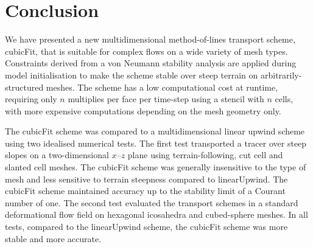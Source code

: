\section{Conclusion}

We have presented a new multidimensional method-of-lines transport scheme, cubicFit, that is suitable for complex flows on a wide variety of mesh types.  Constraints derived from a von Neumann stability analysis are applied during model initialisation to make the scheme stable over steep terrain on arbitrarily-structured meshes.
The scheme has a low computational cost at runtime, requiring only $n$ multiplies per face per time-step using a stencil with $n$ cells, with more expensive computations depending on the mesh geometry only.

The cubicFit scheme was compared to a multidimensional linear upwind scheme using two idealised numerical tests.  The first test transported a tracer over steep slopes on a two-dimensional $x$--$z$ plane using terrain-following, cut cell and slanted cell meshes.
The cubicFit scheme was generally insensitive to the type of mesh and less sensitive to terrain steepness compared to linearUpwind.  The cubicFit scheme maintained accuracy up to the stability limit of a Courant number of one.
The second test evaluated the transport schemes in a standard deformational flow field on hexagonal icosahedra and cubed-sphere meshes.
In all tests, compared to the linearUpwind scheme, the cubicFit scheme was more stable and more accurate.

